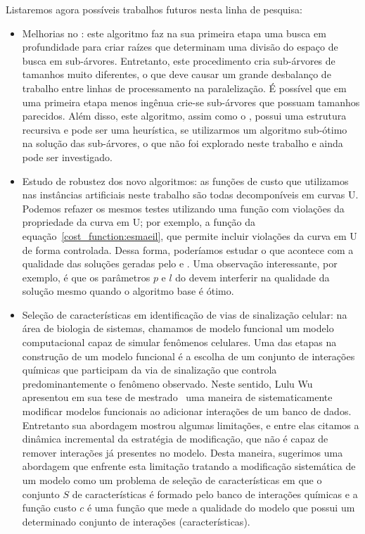 Listaremos agora possíveis trabalhos futuros nesta linha de pesquisa:
\begin{itemize}
    \item{Melhorias no :}  este algoritmo faz na sua primeira etapa uma busca em profundidade para criar raízes que 
determinam uma divisão do espaço de busca em sub-árvores. 
        Entretanto, este procedimento cria sub-árvores de tamanhos 
        muito diferentes, o que deve causar um grande desbalanço de
        trabalho entre linhas de processamento na paralelização. É 
        possível que em uma primeira etapa menos ingênua crie-se 
        sub-árvores que possuam tamanhos parecidos. Além disso, este 
        algoritmo, assim como o , possui uma estrutura
        recursiva e pode ser uma heurística, se utilizarmos um algoritmo
        sub-ótimo na solução das sub-árvores, o que não foi explorado
        neste trabalho e ainda pode ser investigado.
    \item{Estudo de robustez dos novo algoritmos:} as funções de custo
        que utilizamos nas instâncias artificiais neste trabalho são
        todas decomponíveis em curvas U. Podemos refazer os mesmos 
        testes utilizando uma função com violações da propriedade da
        curva em U; por exemplo, a função da equação~\ref{cost_function:esmaeil}, que permite incluir violações da curva em U de forma controlada. Dessa forma, poderíamos estudar o que acontece com a qualidade das soluções
        geradas pelo  e . Uma observação 
        interessante, por exemplo, é que os parâmetros $p$ e $l$ do
         devem interferir na qualidade da solução mesmo
        quando o algoritmo base é ótimo.
    \item{Seleção de características em identificação de vias de 
        sinalização celular:} na área de biologia de sistemas, chamamos
        de modelo funcional um modelo computacional capaz de simular
        fenômenos celulares. Uma das etapas na construção de um modelo
        funcional é a escolha de um conjunto de interações químicas que
        participam da via de sinalização que controla predominantemente 
        o fenômeno observado. Neste sentido, Lulu Wu apresentou 
        em sua tese de mestrado~\cite{Wu15} uma maneira de 
        sistematicamente modificar modelos funcionais ao adicionar 
        interações de um banco de dados. Entretanto sua abordagem 
        mostrou algumas limitações, e entre elas citamos a dinâmica
        incremental da estratégia de modificação, que não é capaz de remover
        interações já presentes no modelo. Desta maneira, sugerimos uma
        abordagem que enfrente esta limitação tratando a modificação
        sistemática de um modelo como um problema de seleção de
        características em que o conjunto $S$ de características é
        formado pelo banco de interações químicas e a função custo $c$ 
        é uma função que mede a qualidade do modelo que possui
        um determinado conjunto de interações (características).
\end{itemize}
